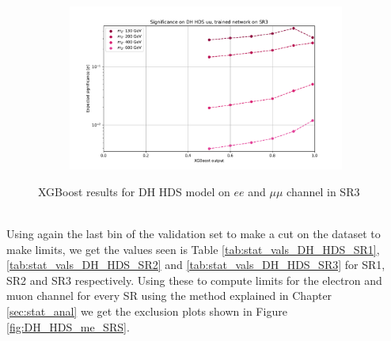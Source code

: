 \documentclass[12pt, a4paper]{book}
\begin{document}
\begin{figure}[!ht]
\begin{subfigure}[b]{0.49\textwidth}
   \end{subfigure}
   \hfill
   \begin{subfigure}[b]{0.49\textwidth}
      \centering
      \includegraphics[width=1\textwidth]{XGBoost/Model_independent/150/DH_HDS/EXP_SIG_uu.pdf}
   \end{subfigure}
   \caption{XGBoost results for DH HDS model on $ee$ and $\mu\mu$ channel in SR3}\label{fig:DH_HDS_SR3}
\end{figure}
\\Using again the last bin of the validation set to make a cut on the dataset to make limits, we get the values seen is Table \ref{tab:stat_vals_DH_HDS_SR1}, \ref{tab:stat_vals_DH_HDS_SR2} and \ref{tab:stat_vals_DH_HDS_SR3} for 
SR1, SR2 and SR3 respectively. Using these to compute limits for the electron and muon channel for every SR using the method explained in Chapter \ref{sec:stat_anal} we get the exclusion plots shown in Figure \ref{fig:DH_HDS_me_SRS}.\\
\end{document}
